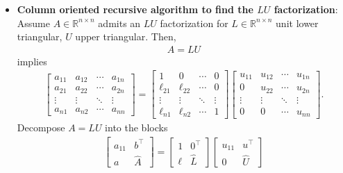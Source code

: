 \documentclass{report}
\begin{document}
\begin{itemize}
        \item \textbf{Column oriented recursive algorithm to find the $LU$ factorization}: 
            Assume $A \in \mathbb{R}^{n\times n }$ admits an $LU$ factorization for $L\in \mathbb{R}^{n\times n}$ unit lower triangular, $U$ upper triangular. Then,
            \begin{align*}
                A = LU
            \end{align*}
            implies
            \begin{align*}
                \begin{bmatrix} a_{11} & a_{12} & \cdots & a_{1n} \\ a_{21} & a_{22} & \cdots & a_{2n} \\ \vdots & \vdots & \ddots & \vdots \\ a_{n1} & a_{n2} & \cdots & a_{nn} \end{bmatrix} = 
                \begin{bmatrix} 1 & 0 & \cdots & 0 \\ \ell_{21} & \ell_{22} & \cdots & 0 \\ \vdots & \vdots & \ddots & \vdots \\ \ell_{n1} & \ell_{n2} & \cdots & 1 \end{bmatrix}
                \begin{bmatrix} u_{11} & u_{12} & \cdots & u_{1n} \\ 0 & u_{22} & \cdots & u_{2n} \\ \vdots & \vdots & \ddots & \vdots \\ 0 & 0 & \cdots & u_{nn} \end{bmatrix}
            .\end{align*}
            Decompose $A = LU$ into the blocks
            \begin{align*}
                \begin{bmatrix}
                    a_{11} & b^{\top} \\
                    a & \hat{A}
                \end{bmatrix}
                =
                \begin{bmatrix}
                    1 & 0^{\top} \\
                    \ell & \hat{L}
                \end{bmatrix}
                \begin{bmatrix}
                    u_{11} & u^{\top} \\
                    0 & \hat{U}
                \end{bmatrix}

\end{align*}
\end{itemize}
\end{document}
